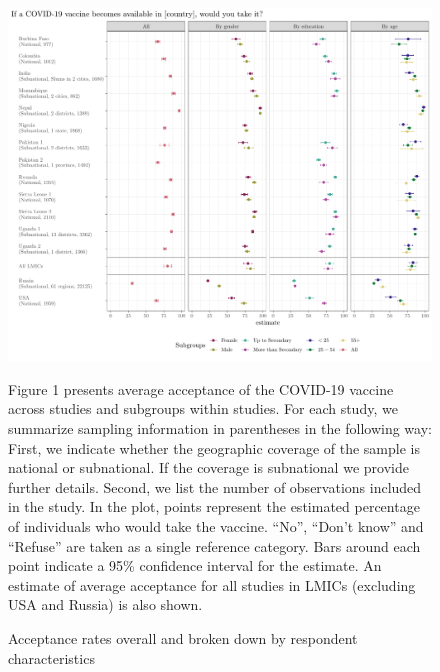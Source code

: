 \documentclass[
  12pt,
]{article}
\providecommand{\DIFaddend}{} %
\DeclareRobustCommand{\DIFaddend}{\DIFOaddend \let\includegraphics\DIFOincludegraphics} %
\begin{document}
\DIFaddend \begin{figure}[!ht]
\caption{Acceptance rates overall and broken down by respondent characteristics \label{fig:mainfigure1}}

\includegraphics{paper_files/figure-latex/mainfigure1-1.pdf}

\scriptsize{Figure 1 presents average acceptance of the COVID-19 vaccine across studies and subgroups within studies. For each study, we summarize sampling information in parentheses in the following way: First, we indicate whether the geographic coverage of the sample is national or subnational. If the coverage is subnational we provide further details. Second, we list the number of observations included in the study. In the plot, points represent the estimated percentage of individuals who would take the vaccine. ``No'', ``Don't know'' and ``Refuse'' are taken as a single reference category. Bars around each point indicate a 95\% confidence interval for the estimate. An estimate of average acceptance for all studies in LMICs (excluding USA and Russia) is also shown.}
\end{figure}
\end{document}
